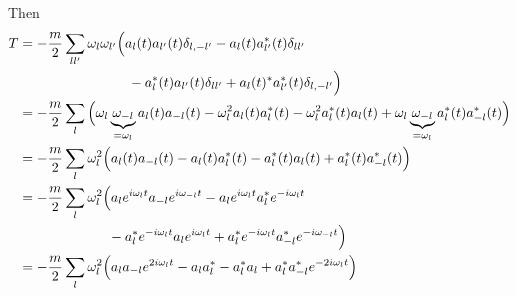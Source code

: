 \documentclass{article}
\begin{document}
\noindent Then
\begin{align*}
    T &= - \dfrac{m}{2} \sum_{l l'} \omega_l \omega_{l'} \Big( a_l (t) a_{l'} (t) \delta_{l,-l'} - a_l (t) a_{l'}^* (t) \delta_{l l'} \\
    & \hspace{1.1in} - a_l^* (t) a_{l'} (t) \delta_{l l'} + a_l (t)^* a_{l'}^* (t) \delta_{l,-l'} \Big) \\
    &= - \dfrac{m}{2} \sum_l \Big( \omega_l \underbrace{\omega_{-l}}_{=\omega_l} a_l (t) a_{-l} (t) - \omega_l^2 a_l (t) a_l^* (t) - \omega_l^2 a_l^* (t) a_l (t) + \omega_l \underbrace{\omega_{-l}}_{=\omega_l} a_l^* (t) a_{-l}^* (t) \Big) \\
    &= - \dfrac{m}{2} \sum_l \omega_l^2 \Big( a_l (t) a_{-l} (t) - a_l (t) a_l^* (t) - a_l^* (t) a_l (t) + a_l^* (t) a_{-l}^* (t) \Big) \\
    &= - \dfrac{m}{2} \sum_l \omega_l^2 \Big( a_l e^{ i \omega_l t } a_{-l} e^{ i \omega_{-l} t } - a_l e^{ i \omega_l t } a_l^* e^{ -i \omega_l t } \\
    & \hspace{0.9in} - a_l^* e^{ -i \omega_l t } a_l e^{ i \omega_l t } + a_l^* e^{ -i \omega_l t } a_{-l}^* e^{ -i \omega_{-l} t } \Big) \\
    &= - \dfrac{m}{2} \sum_l \omega_l^2 \Big( a_l a_{-l} e^{ 2i \omega_l t } - a_l a_l^* - a_l^* a_l + a_l^* a_{-l}^* e^{ -2i \omega_l t } \Big)
\end{align*}

\end{document}
